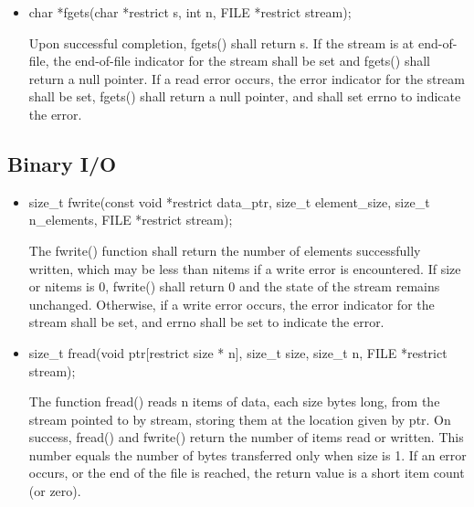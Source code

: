 \documentclass{report}
\begin{document}
\begin{itemize}
        \item \bigbreak \noindent 
            \begin{cppcode}
               char *fgets(char *restrict s, int n, FILE *restrict stream);
            \end{cppcode}
            \bigbreak \noindent 
            Upon successful completion, fgets() shall return s.  If the stream is at end-of-file, the end-of-file indicator for the stream shall be set and fgets() shall return a null pointer.  If a read error occurs, the error indicator for the stream shall be set, fgets() shall return a null pointer, and shall set errno to indicate the error.

    \end{itemize}

    \pagebreak 
    \subsection{Binary I/O}
    \begin{itemize}
        \item 
            \bigbreak \noindent 
            \begin{cppcode}
                size_t fwrite(const void *restrict data_ptr, size_t element_size, size_t n_elements, FILE *restrict stream); 
            \end{cppcode}
            \bigbreak \noindent 
             The fwrite() function shall return the number of elements successfully written, which may be less than nitems if a write error is encountered. If size or nitems is 0, fwrite() shall return 0 and the state of the stream remains unchanged. Otherwise, if a write error occurs, the error indicator for the stream shall be set, and errno shall be set to indicate the error.
        \item 
            \bigbreak \noindent 
            \begin{cppcode}
            size_t fread(void ptr[restrict size * n], size_t size, size_t n, FILE *restrict stream);
            \end{cppcode}
            \bigbreak \noindent 
            The function fread() reads n items of data, each size bytes long, from the stream pointed to by stream, storing them at the location given by ptr.
            \bigbreak \noindent 
            On success, fread() and fwrite() return the number of items read or written.  This number equals the number of bytes transferred only when size is 1.  If an error occurs, or the end of the file is reached, the return value is a short item count (or zero).

    \end{itemize}
\end{document}
